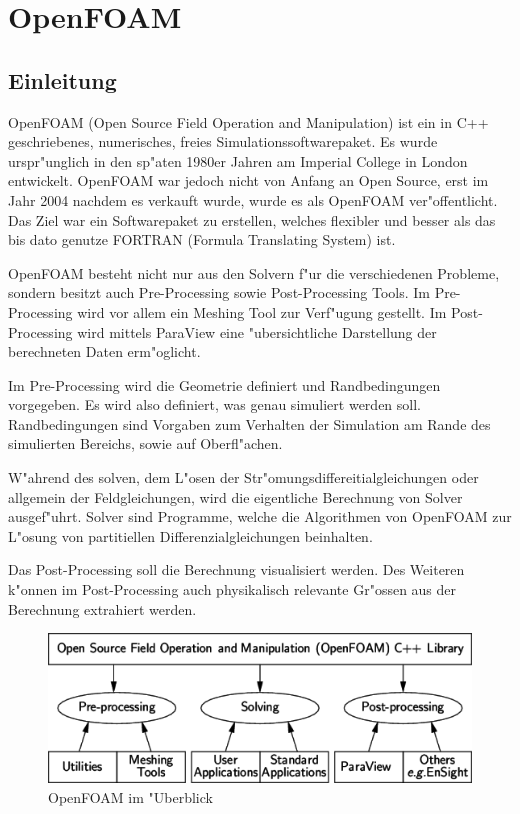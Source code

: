 
\chapter{OpenFOAM}
\begin{refsection}
\section{Einleitung}
OpenFOAM (Open Source Field Operation and Manipulation) ist ein in
C++ geschriebenes, numerisches, freies Simulationssoftwarepaket. Es
wurde urspr"unglich in den sp"aten 1980er Jahren am Imperial College
in London entwickelt. OpenFOAM war jedoch nicht von Anfang an Open
Source, erst im Jahr 2004 nachdem es verkauft wurde, wurde es als
OpenFOAM ver"offentlicht. Das Ziel war ein Softwarepaket zu erstellen,
welches flexibler und besser als das bis dato genutze FORTRAN (Formula
Translating System) ist.

OpenFOAM besteht nicht nur aus den Solvern f"ur die verschiedenen
Probleme, sondern besitzt auch Pre-Processing sowie Post-Processing
Tools. Im Pre-Processing wird vor allem ein Meshing Tool zur Verf"ugung
gestellt. Im Post-Processing wird mittels ParaView eine "ubersichtliche
Darstellung der berechneten Daten erm"oglicht. \cite{ofwiki}

Im Pre-Processing wird die Geometrie definiert und Randbedingungen
vorgegeben. Es wird also definiert, was genau simuliert werden
soll. Randbedingungen sind Vorgaben zum Verhalten der Simulation am
Rande des simulierten Bereichs, sowie auf Oberfl"achen.

W"ahrend des solven, dem L"osen der Str"omungsdiffereitialgleichungen oder
allgemein der Feldgleichungen, wird die eigentliche Berechnung von Solver
ausgef"uhrt. Solver sind Programme, welche die Algorithmen von OpenFOAM
zur L"osung von partitiellen Differenzialgleichungen beinhalten.

Das Post-Processing soll die Berechnung visualisiert werden. Des Weiteren
k"onnen im Post-Processing auch physikalisch relevante Gr"ossen aus der
Berechnung extrahiert werden.
\begin{figure}
\begin{center}
\includegraphics[width = 0.65 \linewidth]{./openfoam/pics/Aufbau.png}
\end{center}
\caption{OpenFOAM im "Uberblick \cite{of} }
\end{figure}


\end{refsection}
